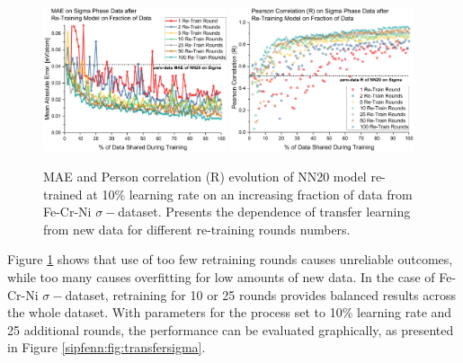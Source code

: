 \begin{figure}[H]
    \centering
    \includegraphics[width=0.48\textwidth]{sipfenn/transferLearning_MAE_vs_rounds.png}
    \includegraphics[width=0.48\textwidth]{sipfenn/transferLearning_R.png}
    \caption{MAE and Person correlation (R) evolution of NN20 model re-trained at 10\% learning rate on an increasing fraction of data from Fe-Cr-Ni $\sigma-$dataset. Presents the dependence of transfer learning from new data for different re-training rounds numbers.}
    \vspace{-12pt}
    \label{sipfenn:fig:transfersigmaARR}
\end{figure}

Figure \ref{sipfenn:fig:transfersigmaARR} shows that use of too few retraining rounds causes unreliable outcomes, while too many causes overfitting for low amounts of new data. In the case of Fe-Cr-Ni $\sigma-$dataset, retraining for 10 or 25 rounds provides balanced results across the whole dataset. With parameters for the process set to 10\% learning rate and 25 additional rounds, the performance can be evaluated graphically, as presented in Figure \ref{sipfenn:fig:transfersigma}.

